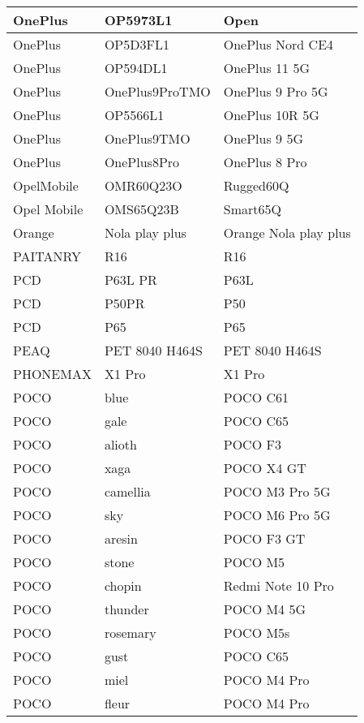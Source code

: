 \begin{tabularx}{\linewidth}{|l|X|X|}
        OnePlus & OP5973L1 & Open \\ \hline
        OnePlus & OP5D3FL1 & OnePlus Nord CE4 \\ \hline
        OnePlus & OP594DL1 & OnePlus 11 5G \\ \hline
        OnePlus & OnePlus9ProTMO & OnePlus 9 Pro 5G \\ \hline
        OnePlus & OP5566L1 & OnePlus 10R 5G \\ \hline
        OnePlus & OnePlus9TMO & OnePlus 9 5G \\ \hline
        OnePlus & OnePlus8Pro & OnePlus 8 Pro \\ \hline
        OpelMobile & OMR60Q23O & Rugged60Q \\ \hline
        Opel Mobile & OMS65Q23B & Smart65Q \\ \hline
        Orange & Nola play plus & Orange Nola play plus \\ \hline
        PAITANRY & R16 & R16 \\ \hline
        PCD & P63L PR & P63L \\ \hline
        PCD & P50PR & P50 \\ \hline
        PCD & P65 & P65 \\ \hline
        PEAQ & PET 8040 H464S & PET 8040 H464S \\ \hline
        PHONEMAX & X1 Pro & X1 Pro \\ \hline
        POCO & blue & POCO C61 \\ \hline
        POCO & gale & POCO C65 \\ \hline
        POCO & alioth & POCO F3 \\ \hline
        POCO & xaga & POCO X4 GT \\ \hline
        POCO & camellia & POCO M3 Pro 5G \\ \hline
        POCO & sky & POCO M6 Pro 5G \\ \hline
        POCO & aresin & POCO F3 GT \\ \hline
        POCO & stone & POCO M5 \\ \hline
        POCO & chopin & Redmi Note 10 Pro \\ \hline
        POCO & thunder & POCO M4 5G \\ \hline
        POCO & rosemary & POCO M5s \\ \hline
        POCO & gust & POCO C65 \\ \hline
        POCO & miel & POCO M4 Pro \\ \hline
        POCO & fleur & POCO M4 Pro \\ \hline

\end{tabularx}
